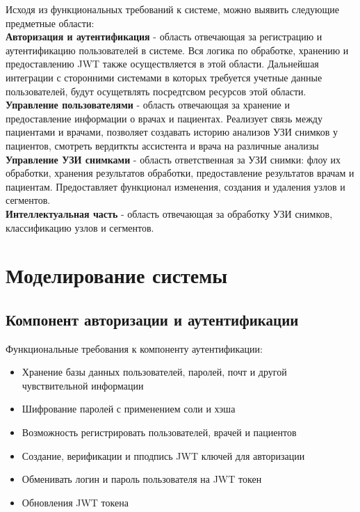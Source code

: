 Исходя из функциональных требований к системе, можно выявить следующие предметные области:\\
\textbf{Авторизация и аутентификация} - область отвечающая за регистрацию и аутентификацию пользователей 
в системе. Вся логика по обработке, хранению и предоставлению JWT также осуществляется в этой области. 
Дальнейшая интеграции с сторонними системами в которых требуется учетные данные пользователей, будут осущетвлять 
посредтсвом ресурсов этой области. \\
\textbf{Управление пользователями} - область отвечающая за хранение и предоставление информации о врачах и пациентах. 
Реализует связь между пациентами и врачами, позволяет создавать историю анализов УЗИ снимков у пациентов, 
смотреть вердиткты ассистента и врача на различные анализы \\
\textbf{Управление УЗИ снимками} - область ответственная за УЗИ снимки: флоу их обработки, хранения результатов обработки, 
предоставление результатов врачам и пациентам. Предоставляет функционал изменения, создания и удаления узлов и сегментов.\\
\textbf{Интеллектуальная часть} - область отвечающая за обработку УЗИ снимков, классификацию узлов и сегментов.

\section{Моделирование системы}

\subsection{Компонент авторизации и аутентификации}

Функциональные требования к компоненту аутентификации:
\begin{itemize}
  \item Хранение базы данных пользователей, паролей, почт и другой чувствительной информации
  \item Шифрование паролей с применением соли и хэша
  \item Возможность регистрировать пользователей, врачей и пациентов
  \item Создание, верификации и пподпись JWT ключей для авторизации
  \item Обменивать логин и пароль пользователя на JWT токен
  \item Обновления JWT токена
\end{itemize}

